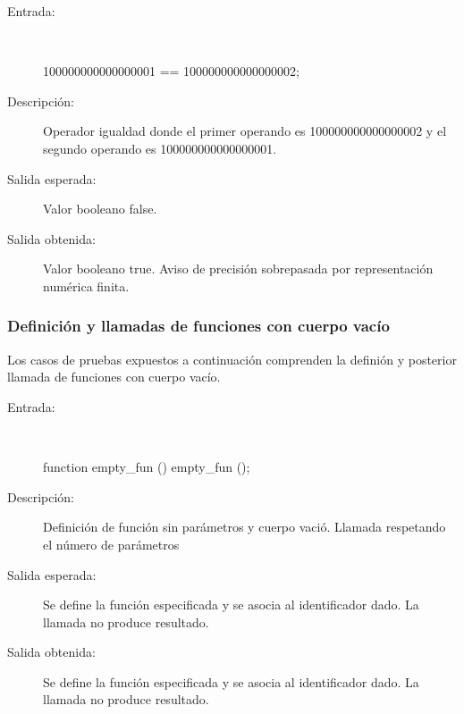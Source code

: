 	\begin{description}
		\item [Entrada:] \hfill \\
\begin{myverbatim}
 100000000000000001 == 100000000000000002;
\end{myverbatim}
		\item [Descripción:] Operador igualdad donde el primer operando es 100000000000000002 y el segundo operando es  100000000000000001.
		\item [Salida esperada:] Valor booleano false.
		\item [Salida obtenida:] Valor booleano true.  Aviso de precisión sobrepasada por representación numérica finita.
	\end{description}

\subsubsection{Definición y llamadas de funciones con cuerpo vacío}

Los casos de pruebas expuestos a continuación comprenden la definión y posterior llamada de funciones con cuerpo vacío.

	\begin{description}
		\item [Entrada:] \hfill \\
\begin{myverbatim}
   function empty_fun () { } 
   empty_fun ();
\end{myverbatim}
		\item [Descripción:] Definición de función sin parámetros y cuerpo vació. Llamada respetando el número de parámetros
		\item [Salida esperada:] Se define la función especificada y se asocia al identificador dado. La llamada no produce resultado.
		\item [Salida obtenida:] Se define la función especificada y se asocia al identificador dado. La llamada no produce resultado.
	\end{description}


